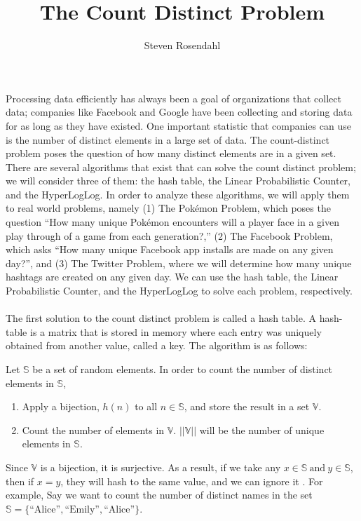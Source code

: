 \documentclass{article}
\title{The Count Distinct Problem}
\author{Steven Rosendahl}
\date{}
\begin{document}
\maketitle
\indent Processing data efficiently has always been a goal of organizations that collect data; companies like Facebook and Google have been collecting and storing data for as long as they have existed.
One important statistic that companies can use is the number of distinct elements in a large set of data.
The count-distinct problem poses the question of how many distinct elements are in a given set. 
There are several algorithms that exist that can solve the count distinct problem; we will consider three of them:
the hash table, the Linear Probabilistic Counter, and the HyperLogLog. 
In order to analyze these algorithms, we will apply them to real world problems, namely (1) The Pok\'emon Problem, which poses the question ``How many unique Pok\'emon encounters will a player face in a given play through of a game from each generation?,'' (2) The Facebook Problem, which asks ``How many unique Facebook app installs are made on any given day?'', and (3) The Twitter Problem, where we will determine how many unique hashtags are created on any given day. 
We can use the hash table, the Linear Probabilistic Counter, and the HyperLogLog to solve each problem, respectively.
\\\\
\indent The first solution to the count distinct problem is called a hash table. 
A hash-table is a matrix that is stored in memory where each entry was uniquely obtained from another value, called a key. 
The algorithm is as follows:
\begin{center}
Let $\mathbb{S}$ be a set of random elements. In order to count the number of distinct elements in $\mathbb{S}$,
\begin{enumerate}
\item Apply a bijection, $h(n)$ to all $n\in\mathbb{S}$, and store the result in a set $\mathbb{V}$.
\item Count the number of elements in $\mathbb{V}$. $||\mathbb{V}||$ will be the number of unique elements in $\mathbb{S}$.
\end{enumerate}
\end{center}
Since $\mathbb{V}$ is a bijection, it is surjective. 
As a result, if we take any $x\in\mathbb{S}\ \text{and}\ y\in\mathbb{S}$, then if $x = y$, they will hash to the same value, and we can ignore it \cite[p. 6]{Maurer}. 
For example, Say we want to count the number of distinct names in the set $\mathbb{S} = \{\text{``Alice''},\text{``Emily''},\text{``Alice''}\}$. 
\end{document}
